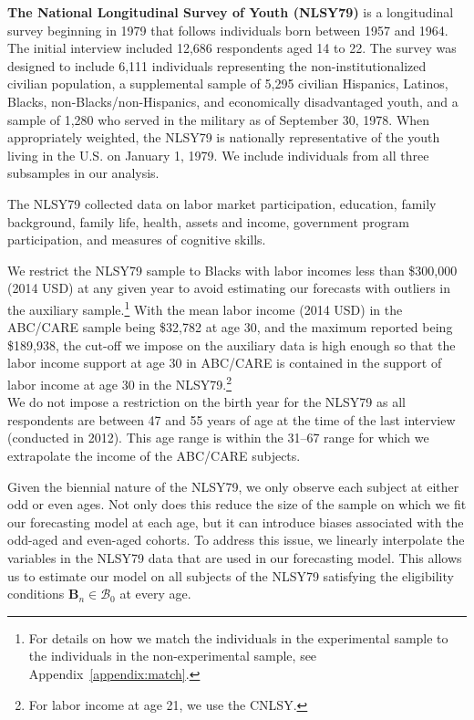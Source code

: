 \noindent\textbf{The National Longitudinal Survey of Youth (NLSY79)} is a longitudinal survey beginning in 1979 that follows individuals born between 1957 and 1964. The initial interview included 12,686 respondents aged 14 to 22. The survey was designed to include 6,111 individuals representing the non-institutionalized civilian population, a supplemental sample of 5,295 civilian Hispanics, Latinos, Blacks, non-Blacks/non-Hispanics, and economically disadvantaged youth, and a sample of 1,280 who served in the military as of September 30, 1978. When appropriately weighted, the NLSY79 is nationally representative of the youth living in the U.S. on January 1, 1979. We include individuals from all three subsamples in our analysis.

\noindent The NLSY79 collected data on labor market participation, education, family background, family life, health, assets and income, government program participation, and measures of cognitive skills.

\noindent We restrict the NLSY79 sample to Blacks with labor incomes less than \$300,000 (2014 USD) at any given year to avoid estimating our forecasts with outliers in the auxiliary sample.\footnote{For details on how we match the individuals in the experimental sample to the individuals in the non-experimental sample, see Appendix~\ref{appendix:match}.} With the mean labor income (2014 USD) in the ABC/CARE sample being \$32,782 at age 30, and the maximum reported being \$189,938, the cut-off we impose on the auxiliary data is high enough so that the labor income support at age 30 in ABC/CARE is contained in the support of labor income at age 30 in the NLSY79.\footnote{For labor income at age 21, we use the CNLSY.}\\

\noindent We do not impose a restriction on the birth year for the NLSY79 as all respondents are between 47 and 55 years of age at the time of the last interview (conducted in 2012). This age range is within the 31--67 range for which we extrapolate the income of the ABC/CARE subjects.

\noindent Given the biennial nature of the NLSY79, we only observe each subject at either odd or even ages. Not only does this reduce the size of the sample on which we fit our forecasting model at each age, but it can introduce biases associated with the odd-aged and even-aged cohorts. To address this issue, we linearly interpolate the variables in the NLSY79 data that are used in our forecasting model. This allows us to estimate our model on all subjects of the NLSY79 satisfying the eligibility conditions $\bm{B}_n \in\mathcal{B}_0$ at every age.

